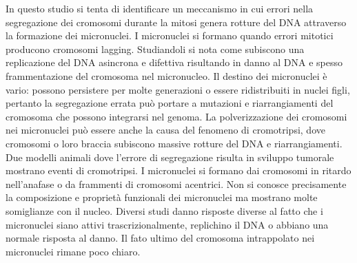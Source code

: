 In questo studio si tenta di identificare un meccanismo in cui errori nella segregazione dei cromosomi durante la mitosi genera rotture del DNA attraverso la formazione dei micronuclei. 
I micronuclei si formano quando errori mitotici producono cromosomi lagging. Studiandoli si nota come subiscono una replicazione del DNA asincrona e difettiva risultando in danno al
DNA e spesso frammentazione del cromosoma nel micronucleo. Il destino dei micronuclei \`e vario: possono persistere per molte generazioni o essere ridistribuiti in nuclei figli, pertanto
la segregazione errata pu\`o portare a mutazioni e riarrangiamenti del cromosoma che possono integrarsi nel genoma. La polverizzazione dei cromosomi nei micronuclei pu\`o essere anche
la causa del fenomeno di cromotripsi, dove cromosomi o loro braccia subiscono massive rotture del DNA e riarrangiamenti. Due modelli animali dove l'errore di segregazione risulta in 
sviluppo tumorale mostrano eventi di cromotripsi. I micronuclei si formano dai cromosomi in ritardo nell'anafase o da frammenti di cromosomi acentrici. Non si conosce precisamente la
composizione e propriet\`a funzionali dei micronuclei ma mostrano molte somiglianze con il nucleo. Diversi studi danno risposte diverse al fatto che i micronuclei siano attivi 
trascrizionalmente, replichino il DNA o abbiano una normale risposta al danno. Il fato ultimo del cromosoma intrappolato nei micronuclei rimane poco chiaro. 
